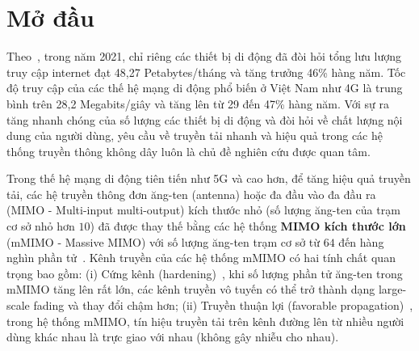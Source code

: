 \clearpage
{}

\chapter*{Mở đầu}
\label{sec:intro}


Theo~\cite{Mtawa2019}, trong năm 2021, chỉ riêng các thiết bị di động đã đòi hỏi tổng lưu lượng truy cập internet đạt 48,27 Petabytes/tháng và tăng trưởng 46\% hàng năm. Tốc độ truy cập của các thế hệ mạng di động phổ biến ở Việt Nam như 4G là trung bình trên 28,2 Megabits/giây và tăng lên từ 29 đến 47\% hàng năm. Với sự ra tăng nhanh chóng của số lượng các thiết bị di động và đòi hỏi về chất lượng nội dung của người dùng, yêu cầu về truyền tải nhanh và hiệu quả trong các hệ thống truyền thông không dây luôn là chủ đề nghiên cứu được quan tâm.

Trong thế hệ mạng di động tiên tiến như 5G và cao hơn, để tăng hiệu quả truyền tải, các hệ truyền thông đơn ăng-ten (antenna) hoặc đa đầu vào đa đầu ra (MIMO - Multi-input multi-output) kích thước nhỏ (số lượng ăng-ten của trạm cơ sở nhỏ hơn $10$) đã được thay thế bằng các hệ thống \textbf{MIMO kích thước lớn} (mMIMO - Massive MIMO) với số lượng ăng-ten trạm cơ sở từ $64$ đến hàng nghìn phần tử~\cite{dahlman2020}. Kênh truyền của các hệ thống mMIMO có hai tính chất quan trọng bao gồm: (i) Cứng kênh (hardening)~\cite{Willhammar2020}, khi số lượng phần tử ăng-ten trong mMIMO tăng lên rất lớn, các kênh truyền vô tuyến có thể trở thành dạng large-scale fading và thay đổi chậm hơn; (ii) Truyền thuận lợi (favorable propagation)~\cite{Ngo2014}, trong hệ thống mMIMO, tín hiệu truyền tải trên kênh đường lên từ nhiều người dùng khác nhau là trực giao với nhau (không gây nhiễu cho nhau).

